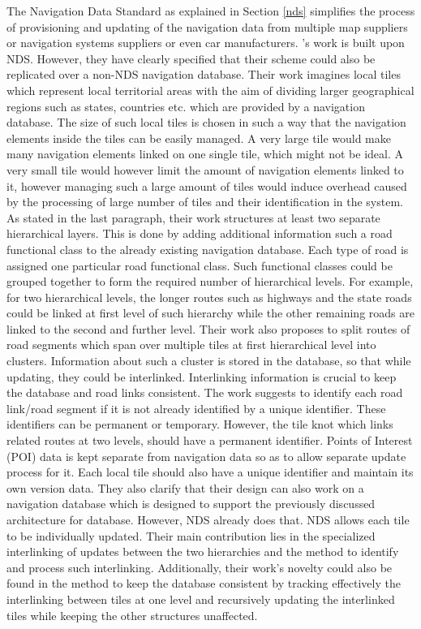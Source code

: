 The Navigation Data Standard as explained in Section \ref{nds} simplifies the process of provisioning and updating of the navigation data from multiple map suppliers or navigation systems suppliers or even car manufacturers. \citet{fischer2012technique}'s work is built upon NDS. However, they have clearly specified that their scheme could also be replicated over a non-NDS navigation database. Their work imagines local tiles which represent local territorial areas with the aim of dividing larger geographical regions such as states, countries etc. which are provided by a navigation database. The size of such local tiles is chosen in such a way that the navigation elements inside the tiles can be easily managed. A very large tile would make many navigation elements linked on one single tile, which might not be ideal. A very small tile would however limit the amount of navigation elements linked to it, however managing such a large amount of tiles would induce overhead caused by the processing of large number of tiles and their identification in the system. As stated in the last paragraph, their work structures at least two separate hierarchical layers. This is done by adding additional information such a road functional class to the already existing navigation database. Each type of road is assigned one particular road functional class. Such functional classes could be grouped together to form the required number of hierarchical levels. For example, for two hierarchical levels, the longer routes such as highways and the state roads could be linked at first level of such hierarchy while the other remaining roads are linked to the second and further level. Their work also proposes to split routes of road segments which span over multiple tiles at first hierarchical level into clusters. Information about such a cluster is stored in the database, so that while updating, they could be interlinked. Interlinking information is crucial to keep the database and road links consistent. The work suggests to identify each road link/road segment if it is not already identified by a unique identifier. These identifiers can be permanent or temporary. However, the tile knot which links related routes at two levels, should have a permanent identifier. Points of Interest (POI) data is kept separate from navigation data so as to allow separate update process for it. Each local tile should also have a unique identifier and maintain its own version data. They also clarify that their design can also work on a navigation database which is designed to support the previously discussed architecture for database. However, NDS already does that. NDS allows each tile to be individually updated. Their main contribution lies in the specialized interlinking of updates between the two hierarchies and the method to identify and process such interlinking. Additionally, their work's novelty could also be found in the method to keep the database consistent by tracking effectively the interlinking between tiles at one level and recursively updating the interlinked tiles while keeping the other structures unaffected.     

